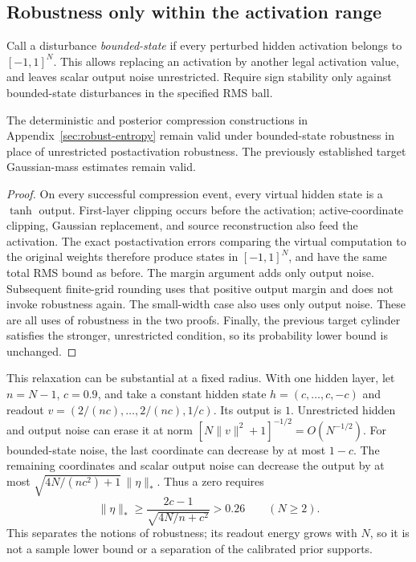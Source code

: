 \subsection{Robustness only within the activation range}

Call a disturbance \emph{bounded-state} if every perturbed hidden activation
belongs to $[-1,1]^N$. This allows replacing an activation by another legal
activation value, and leaves scalar output noise unrestricted. Require
sign stability only against bounded-state disturbances in the specified
RMS ball.

\begin{proposition}
\label{prop:bounded-state-compression}
The deterministic and posterior compression constructions in Appendix~\ref{sec:robust-entropy} remain valid under bounded-state robustness in place of unrestricted
postactivation robustness. The previously established target Gaussian-mass
estimates remain valid.
\end{proposition}

\begin{proof}
On every successful compression event, every virtual hidden state is a
$\tanh$ output. First-layer clipping occurs before the activation;
active-coordinate clipping, Gaussian replacement, and source reconstruction
also feed the activation. The exact postactivation errors comparing the
virtual computation to the original weights therefore produce states in
$[-1,1]^N$, and have the same total RMS bound as before. The margin argument
adds only output noise. Subsequent finite-grid rounding uses that positive
output margin and does not invoke robustness again. The small-width case
also uses only output noise. These are all uses of robustness in the two
proofs. Finally, the previous target cylinder satisfies the stronger,
unrestricted condition, so its probability lower bound is unchanged.
\end{proof}

This relaxation can be substantial at a fixed radius. With one hidden
layer, let $n=N-1$, $c=0.9$, and take a constant hidden state
$h=(c,\ldots,c,-c)$ and readout
$v=(2/(nc),\ldots,2/(nc),1/c)$. Its output is $1$.
Unrestricted hidden and output noise can erase it at norm
$[N\|v\|^2+1]^{-1/2}=O(N^{-1/2})$.
For bounded-state noise, the last coordinate can decrease by at most
$1-c$. The remaining coordinates and scalar output noise can decrease the
output by at most
$\sqrt{4N/(nc^2)+1}\,\|\eta\|_*$.
Thus a zero requires
\[
 \|\eta\|_*\ge\frac{2c-1}{\sqrt{4N/n+c^2}}>0.26
 \qquad(N\ge2).
\]
This separates the notions of robustness; its readout energy grows with
$N$, so it is not a sample lower bound or a separation of the calibrated
prior supports.

